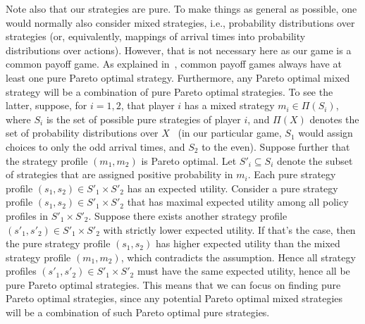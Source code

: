 Note also that our strategies are pure. To make things as general as possible, one would normally also consider mixed strategies, i.e., probability distributions over strategies (or, equivalently, mappings of arrival times into probability distributions over actions).  However, that is not necessary here as our game is a common payoff game. As explained in~\cite{leyton2022essentials}, common payoff games always have at least one pure Pareto optimal strategy. Furthermore, any Pareto optimal mixed strategy will be a combination of pure Pareto optimal strategies. 
To see the latter, suppose, for $i=1,2$, that player $i$ has a mixed strategy $m_i \in \Pi(S_i)$, where $S_i$ is the set of possible pure strategies of player $i$, and $\Pi(X)$ denotes the set of probability distributions over $X$~\cite{shoham2008multiagent} (in our particular game, $S_1$ would assign choices to only the odd arrival times, and $S_2$ to the even). Suppose further that the strategy profile $(m_1,m_2)$ is Pareto optimal. Let $S'_i \subseteq S_i$ denote the subset of strategies that are assigned positive probability in $m_i$. 
Each pure strategy profile $(s_1,s_2) \in S'_1 \times S'_2$ has an expected utility. Consider a pure strategy profile $(s_1,s_2) \in S'_1 \times S'_2$ that has maximal expected utility among all policy profiles in $S'_1 \times S'_2$. Suppose there exists another strategy profile $(s'_1,s'_2) \in S'_1 \times S'_2$ with strictly lower expected utility. If that's the case, then the pure strategy profile $(s_1,s_2)$ has higher expected utility than the mixed strategy profile $(m_1,m_2)$, which contradicts the assumption. Hence all strategy profiles $(s'_1,s'_2) \in S'_1 \times S'_2$ must have the same expected utility, hence all be pure Pareto optimal strategies. This means that we can focus on finding pure Pareto optimal strategies, since any potential Pareto optimal mixed strategies will be a combination of such Pareto optimal pure strategies.   



